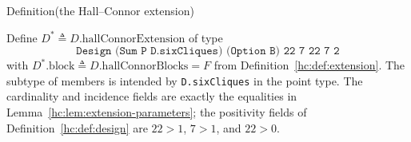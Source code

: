 \begin{mergedproofsection}
\begin{namedresult}{Definition}{(the Hall--Connor extension)}\label{hc:def:extension-design}
 \leavevmode\par
 Define $D^*\triangleq D.\mathrm{hallConnorExtension}$ of type
 \[
 \texttt{Design (Sum P D.sixCliques) (Option B) 22 7 22 7 2}
 \]
 with $D^*.\mathrm{block}\triangleq D.\mathrm{hallConnorBlocks}=F$
 from Definition~\ref{hc:def:extension}. The subtype of members
 is intended by \texttt{D.sixCliques} in the point type.
 The cardinality and incidence fields are exactly the equalities in
 Lemma~\ref{hc:lem:extension-parameters}; the positivity fields of
 Definition~\ref{hc:def:design} are $22>1$, $7>1$, and $22>0$.
\end{namedresult}


\end{mergedproofsection}
